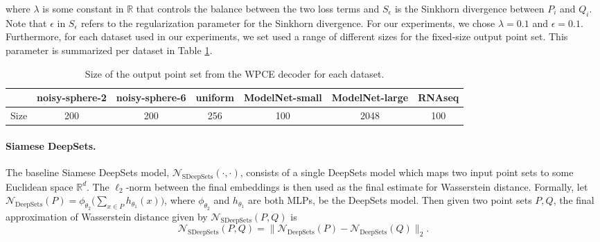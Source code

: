 \documentclass[12pt]{article}
\newcommand{\R}{\mathbb R}
\begin{document}
where $\lambda$ is some constant in $\R$ that controls the balance between the two loss terms and $S_{\epsilon}$ is the Sinkhorn divergence between $P_i$ and $Q_i$. Note that $\epsilon$ in $S_{\epsilon}$ refers to the regularization parameter for the Sinkhorn divergence. For our experiments, we chose $\lambda = 0.1$ and $\epsilon = 0.1$. Furthermore, for each dataset used in our experiments, we set used a range of different sizes for the fixed-size output point set. This parameter is summarized per dataset in  Table \ref{tab:WPCE-decoding}.
\begin{table}[t]
    \centering
    \caption{Size of the output point set from the WPCE decoder for each dataset. }
    \begin{tabular}{lcccccc}
        \toprule
             & noisy-sphere-2 & noisy-sphere-6 & uniform & ModelNet-small & ModelNet-large & RNAseq\\
        \midrule
        Size & 200 & 200 & 256 & 100 & 2048 &100\\
        \bottomrule
    \end{tabular}
    \label{tab:WPCE-decoding}
\end{table}

\paragraph{Siamese DeepSets.} The baseline Siamese DeepSets model, $\mathcal{N}_{\mathrm{SDeepSets}}(\cdot, \cdot)$, consists of a single DeepSets model which maps two input point sets to some Euclidean space $\R^d$. 
The $\ell_2$-norm between the final embeddings is then used as the final estimate for Wasserstein distance. Formally, let $\mathcal{N}_{\mathrm{DeepSets}}(P) = \phi_{\theta_2}\Big(\sum_{x \in P} h_{\theta_1}(x)\Big)$, where $\phi_{\theta_2}$ and $h_{\theta_1}$ are both MLPs, be the DeepSets model. 
Then given two point sets $P, Q$, the final approximation of Wasserstein distance given by $\mathcal{N}_{\mathrm{SDeepSets}}(P, Q)$ is 
\begin{equation*}
    \mathcal{N}_{\mathrm{SDeepSets}}(P, Q) = \|\mathcal{N}_{\mathrm{DeepSets}}(P) - \mathcal{N}_{\mathrm{DeepSets}}(Q)\|_2.
\end{equation*}
\end{document}
